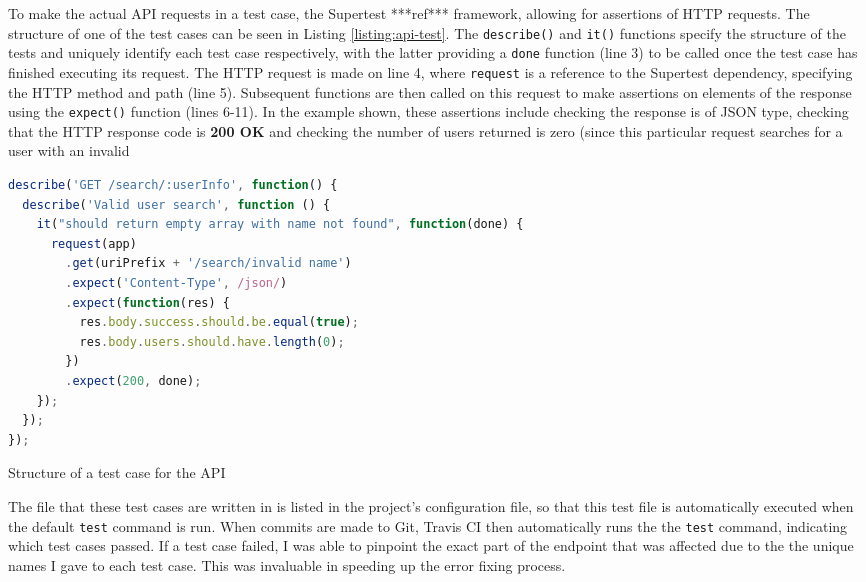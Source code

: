 To make the actual API requests in a test case, the Supertest ***ref*** framework, allowing for assertions of HTTP requests. The structure of one of the test cases can be seen in Listing \ref{listing:api-test}. The \verb|describe()| and \verb|it()| functions specify the structure of the tests and uniquely identify each test case respectively, with the latter providing a \verb|done| function (line 3) to be called once the test case has finished executing its request. The HTTP request is made on line 4, where \verb|request| is a reference to the Supertest dependency, specifying the HTTP method and path (line 5). Subsequent functions are then called on this request to make assertions on elements of the response using the \verb|expect()| function (lines 6-11). In the example shown, these assertions include checking the response is of JSON type, checking that the HTTP response code is \textbf{200 OK} and checking the number of users returned is zero (since this particular request searches for a user with an invalid

\medskip

\begin{listing}
  \centering
  \begin{lstlisting}[language=javascript]
describe('GET /search/:userInfo', function() {
  describe('Valid user search', function () {
    it("should return empty array with name not found", function(done) {
      request(app)
        .get(uriPrefix + '/search/invalid name')
        .expect('Content-Type', /json/)
        .expect(function(res) {
          res.body.success.should.be.equal(true);
          res.body.users.should.have.length(0);
        })
        .expect(200, done);
    });
  });
});
  \end{lstlisting}
  \caption{Structure of a test case for the API}
  \label{listing:api-test}
\end{listing}


The file that these test cases are written in is listed in the project's configuration file, so that this test file is automatically executed when the default \verb|test| command is run. When commits are made to Git, Travis CI then automatically runs the the \verb|test| command, indicating which test cases passed. If a test case failed, I was able to pinpoint the exact part of the endpoint that was affected due to the the unique names I gave to each test case. This was invaluable in speeding up the error fixing process.

